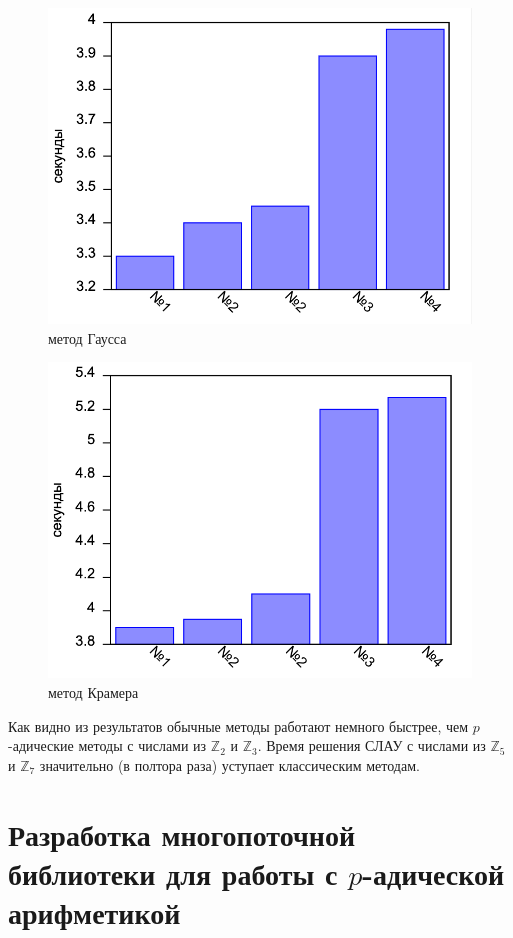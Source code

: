 \documentclass[master, och, diploma, times]{sty/SCWorks}
\theoremstyle{plain}
\theoremstyle{definition}
\begin{document}
\begin{figure}[H]
\centerline{\includegraphics[width=0.85\linewidth]{../gnuplot/single/system_gauss/plot.png}}
\caption{метод Гаусса}
\label{img:single:system}
\end{figure}

\begin{figure}[H]
\centerline{\includegraphics[width=0.85\linewidth]{../gnuplot/single/system_cramer/plot.png}}
\caption{метод Крамера}
\label{img:single:system}
\end{figure}
 
 Как видно из результатов обычные методы работают немного быстрее, чем $p$-адические методы с числами из $\mathbb{Z}_2$ и $\mathbb{Z}_3$. Время решения СЛАУ с числами из $\mathbb{Z}_5$ и $\mathbb{Z}_7$ значительно (в полтора раза) уступает классическим методам.
 
\section{Разработка многопоточной библиотеки для работы с $p$-адической арифметикой}
\end{document}
